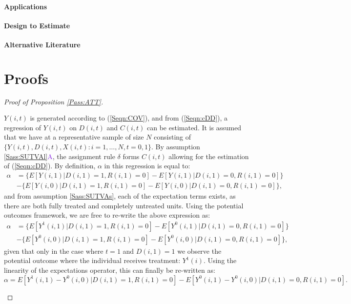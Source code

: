 \documentclass[12pt]{article}
\newcommand{\asref}[2]{\ref{#1}{\textcolor{BlueViolet}{#2}}}
\begin{document}
\begin{spacing}{1.3}
\paragraph{Applications} \citet{MiguelKremer2004}

\paragraph{Design to Estimate} \citet{Bairdetal2014}

\paragraph{Alternative Literature} \citet{ChaisemartinDHaultfoeuille2017}

\clearpage


\section{Proofs}
\label{app:proof}
\begin{proof}[Proof of Proposition \ref{Pass:ATT}]
\begin{footnotesize}
$Y(i,t)$ is generated according to (\ref{Seqn:COV}), and from (\ref{Seqn:cDD}),
a regression of $Y(i,t)$ on $D(i,t)$ and $C(i,t)$ can be estimated.  It is 
assumed that we have at a representative sample of size $N$ consisting of 
$\{Y(i,t),D(i,t),X(i,t): i=1, \ldots, N, t=0, 1\}$.  By assumption 
\asref{Sass:SUTVAl}{A}, the assignment rule $\delta$ forms $C(i,t)$ allowing for 
the estimation of (\ref{Seqn:cDD}). By definition, $\alpha$ in this regression 
is equal to:
\begin{equation}
\nonumber
\label{Seqn:alphaProof1}
\begin{split}
\alpha&=\{E[Y(i,1)|D(i,1)=1,R(i,1)=0]-E[Y(i,1)|D(i,1)=0,R(i,1)=0]\} \\
      &-\{E[Y(i,0)|D(i,1)=1,R(i,1)=0]-E[Y(i,0)|D(i,1)=0,R(i,1)=0]\},
\end{split}
\end{equation}
and from assumption \ref{Sass:SUTVAs}, each of the expectation terms exists, as 
there are both fully treated and completely untreated units. Using the potential 
outcomes framework, we are free to re-write the above expression as:
\begin{equation}
\nonumber
\label{Seqn:alphaProof2}
\begin{split}
\alpha&=\{E[Y^1(i,1)|D(i,1)=1,R(i,1)=0]-E[Y^0(i,1)|D(i,1)=0,R(i,1)=0]\} \\
      &-\{E[Y^0(i,0)|D(i,1)=1,R(i,1)=0]-E[Y^0(i,0)|D(i,1)=0,R(i,1)=0]\},
\end{split}
\end{equation}
given that only in the case where $t=1$ and $D(i,1)=1$ we observe the potential 
outcome where the individual receives treatment: $Y^1(i)$.  Using the linearity
of the expectations operator, this can finally be re-written as:
\begin{equation}
\nonumber
\label{Seqn:alphaProof3}
\alpha=E[Y^1(i,1)-Y^0(i,0)|D(i,1)=1,R(i,1)=0] - 
       E[Y^0(i,1)-Y^0(i,0)|D(i,1)=0,R(i,1)=0].
\end{equation}


\end{footnotesize}
\end{proof}
\end{spacing}
\end{document}
